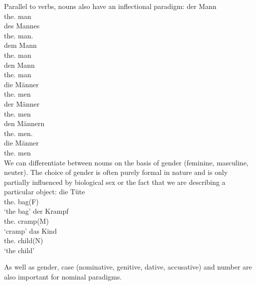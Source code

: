 Parallel to verbs, nouns also have an inflectional paradigm:
\eal
\ex 
\gll der Mann\\
	 the.\nom{} man\\
\ex 
\gll des Mannes\\
	 the.\gen{} man.\gen{}\\
\ex 
\gll dem Mann\\
	 the.\dat{} man\\
\ex 
\gll den Mann\\
	 the.\acc{} man\\
\ex 
\gll die Männer\\
	 the.\nom{} men\\
\ex 
\gll der Männer\\
	 the.\gen{} men\\
\ex 
\gll den Männern\\
	 the.\dat{} men.\dat\\
\ex 
\gll die Männer\\
	 the.\acc{} men\\
\zl
We can differentiate between nouns on the basis of gender (feminine, masculine, neuter). The choice of gender is often
purely formal in nature and is only partially influenced by biological sex or the fact that we are describing a particular object:
\eal
\ex
\gll die Tüte\\
	 the.\fem{} bag(F)\\
\glt `the bag'
\ex 
\gll der Krampf\\
	 the.\mas{} cramp(M)\\
\glt `cramp'
\ex 
\gll das Kind\\
	 the.\neu{} child(N)\\
\glt `the child'
\zl


As well as gender, case (nominative,
genitive, dative, accusative) and number are
also important for nominal paradigms.

